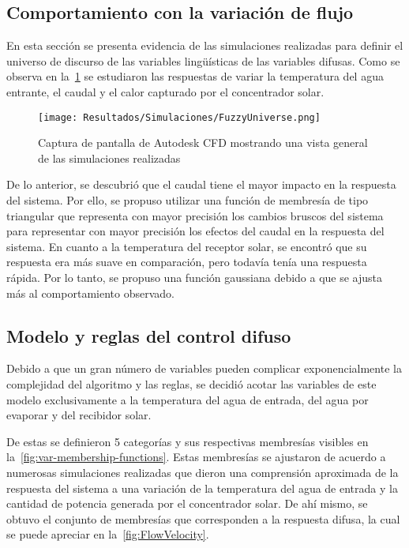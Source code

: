 		\subsection{Comportamiento con la variación de flujo}
				
				En esta sección se presenta evidencia de las simulaciones realizadas para definir el universo de discurso de las variables lingüísticas de las variables difusas. Como se observa en la~\cref{fig:FuzzyUniverse} se estudiaron las respuestas de variar la temperatura del agua entrante, el caudal y el calor capturado por el concentrador solar.
								
				\begin{figure}[H]
					\centering
					\texttt{[image: Resultados/Simulaciones/FuzzyUniverse.png]}
					\caption{Captura de pantalla de Autodesk CFD mostrando una vista general de las simulaciones realizadas}
					\label{fig:FuzzyUniverse}
				\end{figure}
								
				De lo anterior, se descubrió que el caudal tiene el mayor impacto en la respuesta del sistema. Por ello, se propuso utilizar una función de membresía de tipo triangular que representa con mayor precisión los cambios bruscos del sistema para representar con mayor precisión los efectos del caudal en la respuesta del sistema. En cuanto a la temperatura del receptor solar, se encontró que su respuesta era más suave en comparación, pero todavía tenía una respuesta rápida. Por lo tanto, se propuso una función gaussiana debido a que se ajusta más al comportamiento observado.
				
		
		\subsection{Modelo y reglas del control difuso}
			
			Debido a que un gran número de variables pueden complicar exponencialmente la complejidad del algoritmo y las reglas, se decidió acotar las variables de este modelo exclusivamente a la temperatura del agua de entrada, del agua por evaporar y del recibidor solar.			
			
			De estas se definieron 5 categorías y sus respectivas membresías visibles en la~\cref{fig:var-membership-functions}. Estas membresías se ajustaron de acuerdo a numerosas simulaciones realizadas que dieron una comprensión aproximada de la respuesta del sistema a una variación de la temperatura del agua de entrada y la cantidad de potencia generada por el concentrador solar. De ahí mismo, se obtuvo el conjunto de membresías que corresponden a la respuesta difusa, la cual se puede apreciar en la~\cref{fig:FlowVelocity}.
			
